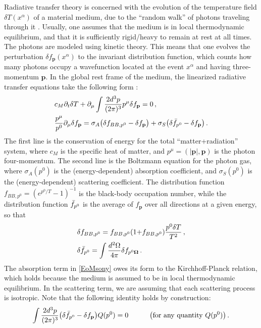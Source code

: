 \documentclass[a4paper, amsfonts, amssymb, amsmath, reprint, showkeys, nofootinbib, twoside,notitlepage,onecolumn]{revtex4-2}
\newcommand{\spc}{\quad \quad \quad}
\theoremstyle{definition}
\theoremstyle{theorem}
\theoremstyle{corollary}
\begin{document}
Radiative transfer theory is concerned with the evolution of the temperature field $\delta T(x^\alpha)$ of a material medium, due to the ``random walk'' of photons traveling through it \cite{mihalas_book}. Usually, one assumes that the medium is in local thermodynamic equilibrium, and that it is sufficiently rigid/heavy to remain at rest at all times. The photons are modeled using kinetic theory. This means that one evolves the perturbation $ \delta f_\mathbf{p}(x^\alpha)$ to the invariant distribution function, which counts how many photons occupy a wavefunction located at the event $x^\alpha$ and having three-momentum $\mathbf{p}$. In the global rest frame of the medium, the linearized radiative transfer equations take the following form \cite{Pomraning1973,Minerbo1978,Levermore1984,CastorRadiationBook_2004}:
\begin{equation}\label{EoMsony}
\begin{split}
& c_M \partial_t \delta T +\partial_\mu \int \dfrac{2d^3 p}{(2\pi)^3 } p^\mu \delta f_\mathbf{p} =0 \, , \\
& \dfrac{p^\mu}{p^0}\partial_\mu \delta f_\mathbf{p} = \sigma_A \big(\delta f_{BB,p^0}-\delta f_\mathbf{p}\big)+\sigma_S \big(\delta \Bar{f}_{p^0} -\delta f_\mathbf{p}\big) \, . \\
\end{split}
\end{equation}
The first line is the conservation of energy for the total ``matter+radiation'' system, where $c_M$ is the specific heat of matter, and $p^\mu=(|\mathbf{p}|,\mathbf{p})$ is the photon four-momentum. The second line is the Boltzmann equation for the photon gas, where $\sigma_A(p^0)$ is the (energy-dependent) absorption coefficient, and $\sigma_S(p^0)$ is the (energy-dependent) scattering coefficient. The distribution function $f_{BB,p^0}=(e^{p^0/T}{-}1)^{-1}$ is the black-body occupation number, while the distribution function $\Bar{f}_{p^0}$ is the average of $f_\mathbf{p}$ over all directions at a given energy, so that
\begin{equation}\label{theotherfunctions}
\begin{split}
& \delta f_{BB,p^0} = f_{BB,p^0}(1{+}f_{BB,p^0}) \dfrac{p^0 \delta T}{T^2} \, , \\
& \delta \Bar{f}_{p^0}= \int \dfrac{d^2 \Omega}{4\pi} \delta f_{p^0\mathbf{\Omega}}\, . \\
\end{split}
\end{equation}
The absorption term in \eqref{EoMsony} owes its form to the Kirchhoff-Planck relation, which holds because the medium is assumed to be in local thermodynamic equilibrium. In the scattering term, we are assuming that each scattering process is isotropic. Note that the following identity holds by construction:
\begin{equation}\label{consturzionne}
\int \dfrac{2d^3p}{(2\pi)^3} \big(\delta \Bar{f}_{p^0} -\delta f_\mathbf{p}\big)Q(p^0)=0 \spc \big(\text{for any quantity }Q(p^0)\big) \, .
\end{equation}
\end{document}
